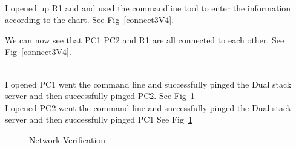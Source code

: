 \documentclass[../EngineeringJournal_CDavis.tex]{subfiles}
\begin{document}
\noindent \\I opened up R1 and and used the commandline tool to enter the information
according to the chart. See Fig~\ref{connect3V4}.
\hfill\break

We can now see that PC1 PC2 and R1 are all connected to each other. See
Fig~\ref{connect3V4}.
\hfill\break

\newpage

\noindent{}
\\I opened PC1 went the command line and successfully pinged the Dual stack server and
then successfully pinged PC2. See Fig~\ref{verify3V4}
\\I opened PC2 went the command line and successfully pinged the Dual stack server and
then successfully pinged PC1 See Fig~\ref{verify3V4}

\hfill\break

\begin{figure}[!hbt]\centering
{}\hfill
{}\par 
\caption{Network Verification}
\label{verify3V4}
\end{figure}
\end{document}
